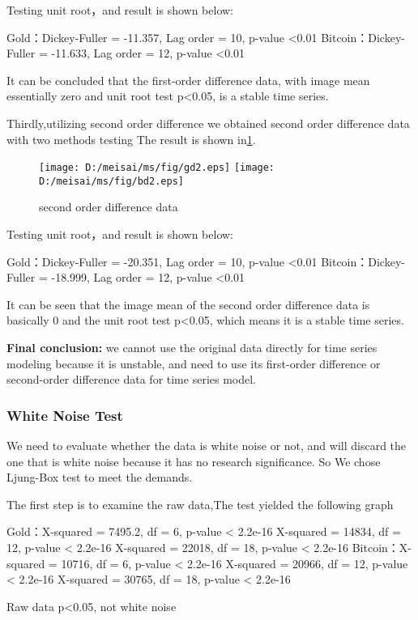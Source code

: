 \documentclass{mcmthesis}
\begin{document}
Testing unit root，and result is shown below:

Gold：Dickey-Fuller = -11.357, Lag order = 10, p-value <0.01
Bitcoin：Dickey-Fuller = -11.633, Lag order = 12, p-value <0.01

It can be concluded that the first-order difference data, with image mean essentially zero and unit root test p<0.05, is a stable time series.


Thirdly,utilizing second order difference we obtained second order difference data with two methods testing
The result is shown in\ref{fig5}.
\begin{figure}[!h]
  \centering 
  \texttt{[image: D:/meisai/ms/fig/gd2.eps]}
  \texttt{[image: D:/meisai/ms/fig/bd2.eps]}
  \caption{second order difference data} \label{fig5}
\end{figure}

Testing unit root，and result is shown below:

Gold：Dickey-Fuller = -20.351, Lag order = 10, p-value <0.01
Bitcoin：Dickey-Fuller = -18.999, Lag order = 12, p-value <0.01

It can be seen that the image mean of the second order difference data is basically 0 and the unit root test p<0.05, which means it is a stable time series.

\textbf{Final conclusion:} we cannot use the original data directly for time series modeling because it is unstable, and need to use its first-order difference or second-order difference data for time series model.


\subsubsection{White Noise Test}
We need to evaluate whether the data is white noise or not, 
and will discard the one that is white noise because it has no research significance.
So We chose Ljung-Box test to meet the demands.

The first step is to examine the raw data,The test yielded the following graph

Gold：X-squared = 7495.2, df = 6, p-value < 2.2e-16
X-squared = 14834, df = 12, p-value < 2.2e-16
X-squared = 22018, df = 18, p-value < 2.2e-16
Bitcoin：X-squared = 10716, df = 6, p-value < 2.2e-16
X-squared = 20966, df = 12, p-value < 2.2e-16
X-squared = 30765, df = 18, p-value < 2.2e-16

Raw data p<0.05, not white noise
\end{document}
